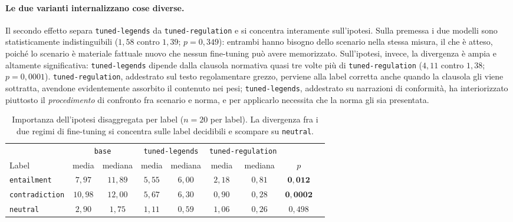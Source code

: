 \documentclass[pdflatex, sn-apa]{sn-jnl}%
\theoremstyle{thmstyleone}%
\theoremstyle{thmstyletwo}%
\theoremstyle{thmstylethree}%
\newcommand{\modelbase}{\texttt{base}}
\newcommand{\modellegends}{\texttt{tuned-legends}}
\newcommand{\modelreg}{\texttt{tuned-regulation}}
\begin{document}
\paragraph{Le due varianti internalizzano cose diverse.}
Il secondo effetto separa \modellegends{} da \modelreg{} e si concentra
interamente sull'ipotesi. Sulla premessa i due modelli sono statisticamente
indistinguibili ($1{,}58$ contro $1{,}39$; $p = 0{,}349$): entrambi hanno bisogno
dello scenario nella stessa misura, il che è atteso, poiché lo scenario è
materiale fattuale nuovo che nessun fine-tuning può avere memorizzato.
Sull'ipotesi, invece, la divergenza è ampia e altamente significativa:
\modellegends{} dipende dalla clausola normativa quasi tre volte più di
\modelreg{} ($4{,}11$ contro $1{,}38$; $p = 0{,}0001$). \modelreg{}, addestrato
sul testo regolamentare grezzo, perviene alla label corretta anche quando la
clausola gli viene sottratta, avendone evidentemente assorbito il contenuto nei
pesi; \modellegends{}, addestrato su narrazioni di conformità, ha interiorizzato
piuttosto il \emph{procedimento} di confronto fra scenario e norma, e per
applicarlo necessita che la norma gli sia presentata.

\begin{table}[h]
\centering
\caption{Importanza dell'ipotesi disaggregata per label ($n=20$ per label). La
divergenza fra i due regimi di fine-tuning si concentra sulle label decidibili e
scompare su \texttt{neutral}.}
\label{tab:xai_labels}
\small
\begin{tabular}{@{}lcccccccc@{}}
\toprule
& \multicolumn{2}{c}{\modelbase} & \multicolumn{2}{c}{\modellegends} & \multicolumn{2}{c}{\modelreg} & \\
\cmidrule(lr){2-3}\cmidrule(lr){4-5}\cmidrule(lr){6-7}
Label & media & mediana & media & mediana & media & mediana & $p$ \\
\midrule
\texttt{entailment}    & $7{,}97$  & $11{,}89$ & $5{,}55$ & $6{,}00$ & $2{,}18$ & $0{,}81$ & $\mathbf{0{,}012}$ \\
\texttt{contradiction} & $10{,}98$ & $12{,}00$ & $5{,}67$ & $6{,}30$ & $0{,}90$ & $0{,}28$ & $\mathbf{0{,}0002}$ \\
\texttt{neutral}       & $2{,}90$  & $1{,}75$  & $1{,}11$ & $0{,}59$ & $1{,}06$ & $0{,}26$ & $0{,}498$ \\
\bottomrule
\end{tabular}
\end{table}
\end{document}
